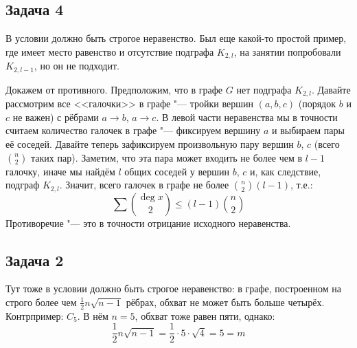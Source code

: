 \subsection{Задача 4}
	\begin{Rem}
		В условии должно быть строгое неравенство.
		Был еще какой-то простой пример, где имеет место равенство и отсутствие подграфа $K_{2,l}$, на занятии попробовали
		$K_{2,l-1}$, но он не подходит.
	\end{Rem}
	Докажем от противного.
	Предположим, что в графе $G$ нет подграфа $K_{2,l}$.
	Давайте рассмотрим все <<галочки>> в графе "--- тройки вершин $(a, b, c)$ (порядок $b$ и $c$ не важен) с рёбрами $a \to b$, $a \to c$.
	В левой части неравенства мы в точности считаем количество галочек в графе "--- фиксируем вершину $a$ и выбираем пары её соседей.
	Давайте теперь зафиксируем произвольную пару вершин $b$, $c$ (всего $\binom{n}{2}$ таких пар).
	Заметим, что эта пара может входить не более чем в $l-1$ галочку, иначе мы найдём $l$ общих соседей у вершин $b$, $c$ и, как следствие, подграф $K_{2,l}$.
	Значит, всего галочек в графе не более $\binom{n}{2}(l-1)$, т.е.:
	\[ \sum \binom{\deg x}{2} \le (l-1)\binom{n}{2} \]
	Противоречие "--- это в точности отрицание исходного неравенства.

\subsection{Задача 2}
	\begin{Rem}
		Тут тоже в условии должно быть строгое неравенство: в графе, построенном на строго более чем $\frac 12 n \sqrt{n-1}$ рёбрах,
		обхват не может быть больше четырёх.
		Контрпример: $C_5$.
		В нём $n=5$, обхват тоже равен пяти, однако:
		\[
			\frac12 n\sqrt{n-1} = \frac12 \cdot 5 \cdot \sqrt 4 = 5 = m
		\]
	\end{Rem}

